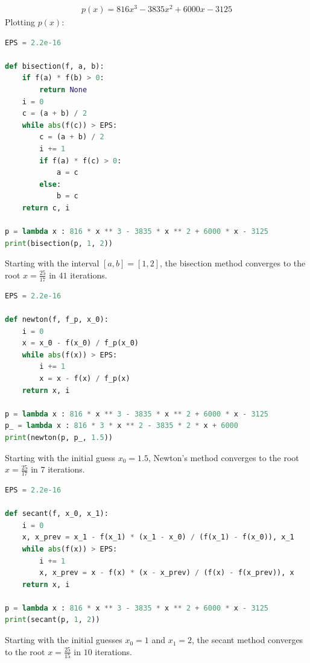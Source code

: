 \documentclass{article}
\begin{document}
\clearpage
\problem{}
\begin{align*}
    p(x) = 816x^3 - 3835x^2 + 6000x - 3125
\end{align*}
Plotting $p(x)$:
\begin{center}
\end{center}
\begin{lstlisting}[language=Python]
EPS = 2.2e-16

def bisection(f, a, b):
    if f(a) * f(b) > 0:
        return None
    i = 0
    c = (a + b) / 2
    while abs(f(c)) > EPS:
        c = (a + b) / 2
        i += 1
        if f(a) * f(c) > 0:
            a = c
        else:
            b = c
    return c, i

p = lambda x : 816 * x ** 3 - 3835 * x ** 2 + 6000 * x - 3125
print(bisection(p, 1, 2))
\end{lstlisting}
Starting with the interval $[a, b] = [1, 2]$, the bisection method converges to the root $x = \frac{25}{17}$ in $41$ iterations.
\begin{lstlisting}[language=Python]
EPS = 2.2e-16

def newton(f, f_p, x_0):
    i = 0
    x = x_0 - f(x_0) / f_p(x_0)
    while abs(f(x)) > EPS:
        i += 1
        x = x - f(x) / f_p(x)
    return x, i

p = lambda x : 816 * x ** 3 - 3835 * x ** 2 + 6000 * x - 3125
p_ = lambda x : 816 * 3 * x ** 2 - 3835 * 2 * x + 6000
print(newton(p, p_, 1.5))
\end{lstlisting}
Starting with the initial guess $x_0 = 1.5$, Newton's method converges to the root $x = \frac{25}{17}$ in $7$ iterations.
\begin{lstlisting}[language=Python]
EPS = 2.2e-16

def secant(f, x_0, x_1):
    i = 0
    x, x_prev = x_1 - f(x_1) * (x_1 - x_0) / (f(x_1) - f(x_0)), x_1
    while abs(f(x)) > EPS:
        i += 1
        x, x_prev = x - f(x) * (x - x_prev) / (f(x) - f(x_prev)), x
    return x, i

p = lambda x : 816 * x ** 3 - 3835 * x ** 2 + 6000 * x - 3125
print(secant(p, 1, 2))
\end{lstlisting}
Starting with the initial guesses $x_0 = 1$ and $x_1 = 2$, the secant method converges to the root $x = \frac{25}{15}$ in $10$ iterations.
\end{document}
